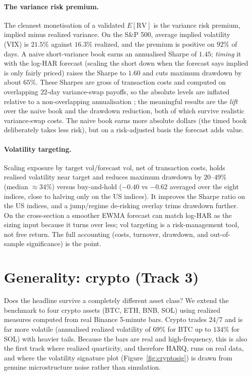 \documentclass[11pt]{article}
\begin{document}
\paragraph{The variance risk premium.} The cleanest monetisation of a validated
$E[\text{RV}]$ is the variance risk premium, implied minus realized variance. On
the S\&P 500, average implied volatility (VIX) is $21.5\%$ against $16.3\%$
realized, and the premium is positive on $92\%$ of days. A naive short-variance
book earns an annualised Sharpe of $1.45$; \emph{timing} it with the log-HAR
forecast (scaling the short down when the forecast says implied is only fairly
priced) raises the Sharpe to $1.60$ and cuts maximum drawdown by about
$65\%$. These Sharpes are gross of transaction costs and computed on overlapping
$22$-day variance-swap payoffs, so the absolute levels are inflated relative to a
non-overlapping annualisation \cite{baileylopezdeprado2014}; the meaningful results are the \emph{lift} over the
naive book and the drawdown reduction, both of which survive realistic
variance-swap costs. The naive book earns more absolute dollars (the timed book
deliberately takes less risk), but on a risk-adjusted basis the forecast adds
value.

\paragraph{Volatility targeting.} Scaling exposure by
$\text{target vol}/\text{forecast vol}$, net of transaction costs, holds realised
volatility near target and reduces maximum drawdown by $20$--$49\%$ (median
$\approx 34\%$) versus buy-and-hold ($-0.40$ vs $-0.62$ averaged over the eight
indices, close to halving only on the US indices). It improves
the Sharpe ratio on the US indices, and a jump/regime de-risking overlay trims
drawdown further. On the cross-section a smoother EWMA forecast can
match log-HAR as the sizing input because it turns over less; vol targeting is a
risk-management tool, not free return. The full accounting (costs, turnover,
drawdown, and out-of-sample significance) is the point.

\section{Generality: crypto (Track 3)}
Does the headline survive a completely different asset class? We extend the
benchmark to four crypto assets (BTC, ETH, BNB, SOL) using realized measures
computed from real Binance 5-minute bars. Crypto trades 24/7 and is far more
volatile (annualised realized volatility of $69\%$ for BTC up to $134\%$ for
SOL) with heavier tails. Because the bars are real and high-frequency, this is
also the first track where realized quarticity, and therefore HARQ, runs on
real data, and where the volatility signature plot
(Figure~\ref{fig:cryptosig}) is drawn from genuine microstructure noise rather
than simulation.
\end{document}
